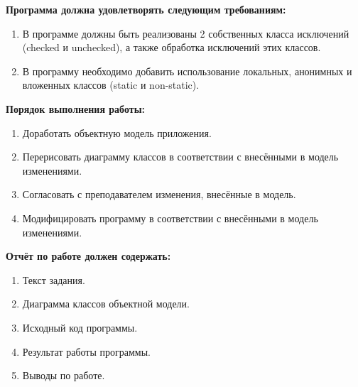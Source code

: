 \newcommand*{\codehl}[1]{\textcolor{fg-pink}{\hl{#1}}}
%
\textbf{Программа должна удовлетворять следующим требованиям:}
\begin{enumerate}
\item В программе должны быть реализованы 2 собственных класса исключений\\ (checked и unchecked), а также обработка исключений этих классов.
\item В программу необходимо добавить использование локальных, анонимных и вложенных классов (static и non-static).
\end{enumerate}

\textbf{Порядок выполнения работы:}
\begin{enumerate}
    \item  Доработать объектную модель приложения.
    \item  Перерисовать диаграмму классов в соответствии с внесёнными в модель изменениями.
    \item  Согласовать с преподавателем изменения, внесённые в модель.
    \item  Модифицировать программу в соответствии с внесёнными в модель изменениями.
\end{enumerate}

\textbf{Отчёт по работе должен содержать:}
\begin{enumerate}
\item  Текст задания.
\item  Диаграмма классов объектной модели.
\item  Исходный код программы.
\item  Результат работы программы.
\item  Выводы по работе.
\end{enumerate}